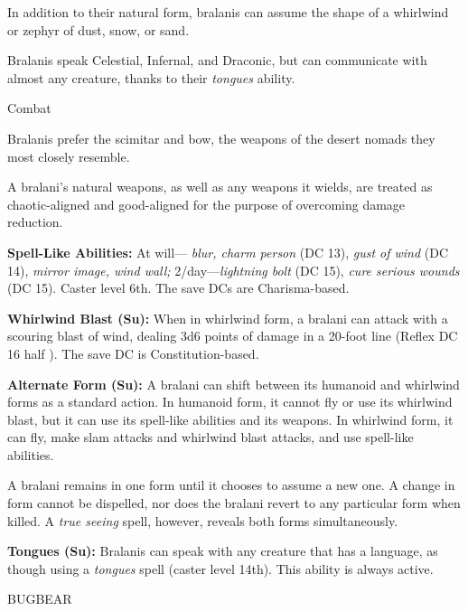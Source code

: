 \documentclass{article}
\begin{document}
In addition to their natural form, bralanis can assume the shape of a whirlwind 
or zephyr of dust, snow, or sand.

Bralanis speak Celestial, Infernal, and Draconic, but can communicate with almost 
any creature, thanks to their \textit{tongues }ability.

Combat

Bralanis prefer the scimitar and bow, the weapons of the desert nomads they most 
closely resemble.

A bralani's natural weapons, as well as any weapons it wields, are treated as chaotic-aligned 
and good-aligned for the purpose of overcoming damage reduction.

\textbf{Spell-Like Abilities:} At will--- \textit{blur, charm person }(DC 13), 
\textit{gust of wind }(DC 14), \textit{mirror image, wind wall; }2/day---\textit{lightning 
bolt }(DC 15), \textit{cure serious wounds }(DC 15). Caster level 6th. The save 
DCs are Charisma-based.

\textbf{Whirlwind Blast (Su): }When in whirlwind form, a bralani can attack with 
a scouring blast of wind, dealing 3d6 points of damage in a 20-foot line (Reflex 
DC 16 half ). The save DC is Constitution-based.

\textbf{Alternate Form (Su): }A bralani can shift between its humanoid and whirlwind 
forms as a standard action. In humanoid form, it cannot fly or use its whirlwind 
blast, but it can use its spell-like abilities and its weapons. In whirlwind form, 
it can fly, make slam attacks and whirlwind blast attacks, and use spell-like abilities. 

A bralani remains in one form until it chooses to assume a new one. A change in 
form cannot be dispelled, nor does the bralani revert to any particular form when 
killed. A \textit{true seeing }spell, however, reveals both forms simultaneously.

\textbf{Tongues (Su):} Bralanis can speak with any creature that has a language, 
as though using a \textit{tongues }spell (caster level 14th). This ability is always 
active.

\vspace{12pt}
{\LARGE{}BUGBEAR}
\end{document}
